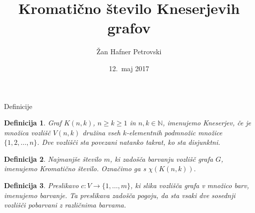 \documentclass{beamer}
\title{Kromatično število Kneserjevih grafov}
\author{Žan Hafner Petrovski}
\institute{Fakulteta za matematiko in fiziko \\
Oddelek za matematiko}
\date{12.\ maj 2017}
\newtheorem{definicija}{Definicija}
\begin{document}

\begin{frame}
\titlepage
\end{frame}


\begin{frame}{Definicije}

\begin{definicija}
Graf $K(n,k)$, $n \geq k \geq 1$ in $n, k \in \mathbb{N}$, imenujemo \mbox{\alert{Kneserjev}}, če je množica vozlišč $V(n,k)$ družina vseh $k$-elementnih podmnožic množice $\{1, 2, \ldots, n\}$. Dve vozlišči sta povezani natanko takrat, ko sta disjunktni.
\end{definicija}

\pause

\begin{definicija}
Najmanjše število $m$, ki zadošča barvanju vozlišč grafa $G$, imenujemo \alert {Kromatično število}. Označimo ga s $\chi(K(n,k)).$
\end{definicija}

\pause

\begin{definicija}
Preslikavo $c: V \rightarrow \{1, \ldots, m\}$, ki slika vozlišča grafa v množico barv, imenujemo \alert {barvanje}. Ta preslikava zadošča pogoju, da sta vsaki dve sosednji vozlišči pobarvani z različnima barvama.
\end{definicija}

\end{frame}

\end{document}
